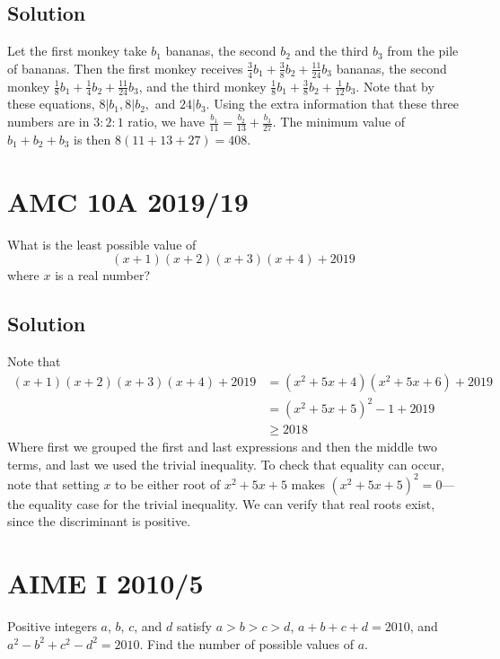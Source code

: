\documentclass[mast]{lucky}
\begin{document}
\subsection{Solution}
Let the first monkey take $b_1$ bananas, the second $b_2$ and the third $b_3$ from the pile of bananas. Then the first monkey receives $\frac34b_1+\frac38b_2+\frac{11}{24}b_3$ bananas, the second monkey $\frac 18 b_1+\frac14b_2+\frac{11}{24}b_3$, and the third monkey $\frac18b_1+\frac38b_2+\frac1{12}b_3$. Note that by these equations, $8|b_1,8|b_2,$ and $24|b_3$. Using the extra information that these three numbers are in $3:2:1$ ratio, we have $\frac{b_1}{11}=\frac{b_2}{13}+\frac{b_3}{27}$. The minimum value of $b_1+b_2+b_3$ is then $8(11+13+27)=408$.

\pagebreak\section{AMC 10A 2019/19}
What is the least possible value of\[(x+1)(x+2)(x+3)(x+4)+2019\]where $x$ is a real number?
\subsection{Solution}
Note that
\begin{align*}
    (x+1)(x+2)(x+3)(x+4)+2019&=(x^2+5x+4)(x^2+5x+6)+2019\\&=(x^2+5x+5)^2-1+2019\\&\ge 2018
\end{align*}
Where first we grouped the first and last expressions and then the middle two terms, and last we used the trivial inequality. To check that equality can occur, note that setting $x$ to be either root of $x^2+5x+5$ makes $(x^2+5x+5)^2=0$—the equality case for the trivial inequality. We can verify that real roots exist, since the discriminant is positive.
\pagebreak\section{AIME I 2010/5}
Positive integers $a$, $b$, $c$, and $d$ satisfy $a > b > c > d$, $a + b + c + d = 2010$, and $a^2 - b^2 + c^2 - d^2 = 2010$. Find the number of possible values of $a$.
\end{document}
